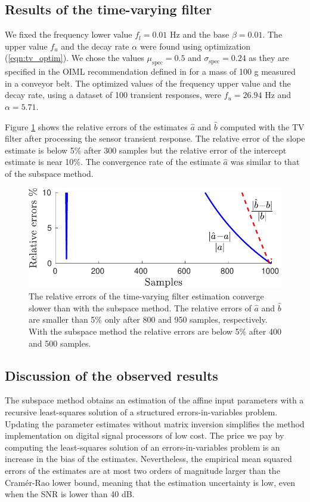 \subsection{Results of the time-varying filter}

We fixed the frequency lower value $f_l=0.01$ Hz and the base $\beta = 0.01$. 
The upper value $f_u$ and the decay rate $\alpha$ were found using optimization (\ref{eqn:tv_optim}). 
We chose the values $\mu_{\mathrm{spec}}=0.5$ and $\sigma_{\mathrm{spec}}=0.24$ as they are specified in the OIML recommendation defined in \citet{OIML_R51_1} for a mass of 100 g measured in a conveyor belt.
The optimized values of the frequency upper value and the decay rate, using a dataset of 100 transient responses, were $f_u = 26.94$ Hz and $\alpha = 5.71$.

Figure \ref{fig:rele_tv_40dB_s1} shows the relative errors of the estimates $\widehat{a}$ and $\widehat{b}$ computed with the TV filter after processing the sensor transient response.
The relative error of the slope estimate is below 5\% after 300 samples but the relative error of the intercept estimate is near 10\%.
The convergence rate of the estimate $\widehat{a}$ was similar to that of the subspace method.

\begin{figure}[!htbp]
\centering
\includegraphics[width=0.69\columnwidth]{./ChapterRampInput/fig/Fig_9.pdf} 
\caption{ \label{fig:rele_tv_40dB_s1} The relative errors of the time-varying filter estimation converge slower than with the subspace method. 
The relative errors of $\widehat{a}$ and $\widehat{b}$ are smaller than 5\% only after 800 and 950 samples, respectively.
With the subspace method the relative errors are below 5\% after 400 and 500 samples. }
\end{figure}



\subsection{Discussion of the observed results}

The subspace method obtains an estimation of the affine input parameters with a recursive least-squares solution of a structured errors-in-variables problem.
Updating the parameter estimates without matrix inversion simplifies the method implementation on digital signal processors of low cost.
The price we pay by computing the least-squares solution of an errors-in-variables problem is an increase in the bias of the estimates.
Nevertheless, the empirical mean squared errors of the estimates are at most two orders of magnitude larger than the Cram\'er-Rao lower bound, meaning that the estimation uncertainty is low, even when the SNR is lower than 40 dB.


